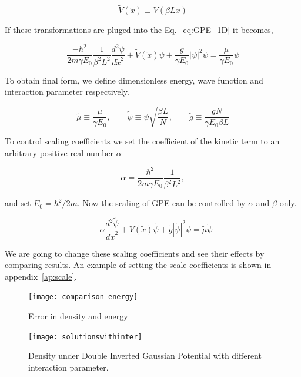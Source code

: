 \documentclass[a4paper,times,hidelinks,12pt]{article}
\begin{document}
$$ \widetilde{V}(\widetilde{x}) \equiv \overline{V}(\beta L x) $$ 

If these transformations are pluged into the Eq.~\eqref{eq:GPE_1D} it becomes,

\begin{equation}
    \label{eq:GPE_1D_dimensionless_en_len}
    \frac{-\hbar^2}{2m\gamma E_0} \frac{1}{\beta^2 L^2}  \frac{d^2\psi}{d \widetilde{x}^2} + \widetilde{V}(\widetilde{x})\psi + \frac{g}{\gamma E_0}|\psi|^2\psi = \frac{\mu}{\gamma E_0}\psi
\end{equation}

To obtain final form, we define dimensionless energy, wave function and interaction parameter respectively. 

$$\widetilde{\mu} \equiv \frac{\mu}{\gamma E_0}, \qquad \widetilde{\psi} \equiv \psi{\sqrt{\frac{\beta L}{N}}}, \qquad \widetilde{g} \equiv \frac{gN}{\gamma E_0 \beta L} $$

To control scaling coefficients we set the coefficient of the kinetic term to an arbitrary positive real number $\alpha$  

$$ \alpha = \frac{\hbar^2}{2m\gamma E_0} \frac{1}{\beta^2 L^2} , $$

and set $E_0 = \hbar^2 / 2m$. Now the scaling of GPE can be controlled by $\alpha$ and $\beta$ only.

\begin{equation}
\label{eq:GPE_dimensionless}
    -\alpha\frac{d^2\widetilde{\psi}}{d\widetilde{x}^2} + \widetilde{V}(\widetilde{x})\widetilde{\psi} + \widetilde{g}|\widetilde{\psi}|^2 \widetilde{\psi} = \widetilde{\mu} \widetilde{\psi}
\end{equation}
    
We are going to change these scaling coefficients and see their effects by comparing results. An example of setting the scale coefficients is shown in appendix~\ref{ap:scale}.



\graphicspath{{"../figs/numericanalyze/"}}
\begin{figure}[H]
\centering
    \texttt{[image: comparison-energy]}
\caption{Error in density and energy}
\label{fig:dens_energy_error}
\end{figure}


\graphicspath{{"../figs/potentials/"}}
\begin{figure}[H]
    \texttt{[image: solutionswithinter]}
    \caption{Density under Double Inverted Gaussian Potential with different interaction parameter.}
\label{fig:gaussian_pot_and_density}
\end{figure}
\end{document}
